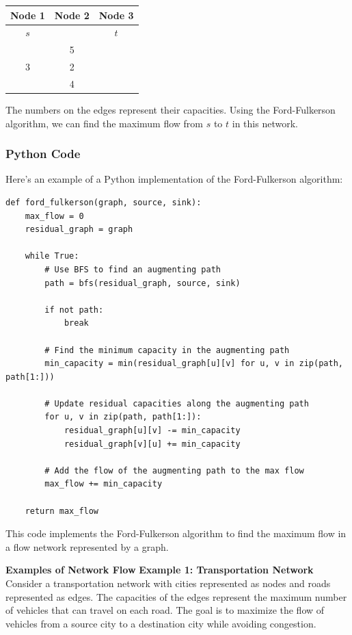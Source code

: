 \documentclass[12pt]{book} %
\begin{document}
\begin{center}
\begin{tabular}{ c c c }
    \textbf{Node 1} & \textbf{Node 2} & \textbf{Node 3} \\
    \hline
    $s$ & & $t$ \\
    & 5 & \\
    3 & 2 & \\
    & 4 & \\
\end{tabular}
\end{center}

The numbers on the edges represent their capacities. Using the Ford-Fulkerson algorithm, we can find the maximum flow from \( s \) to \( t \) in this network.

\subsubsection{Python Code}
Here's an example of a Python implementation of the Ford-Fulkerson algorithm:

\begin{lstlisting}
def ford_fulkerson(graph, source, sink):
    max_flow = 0
    residual_graph = graph
    
    while True:
        # Use BFS to find an augmenting path
        path = bfs(residual_graph, source, sink)
        
        if not path:
            break
        
        # Find the minimum capacity in the augmenting path
        min_capacity = min(residual_graph[u][v] for u, v in zip(path, path[1:]))
        
        # Update residual capacities along the augmenting path
        for u, v in zip(path, path[1:]):
            residual_graph[u][v] -= min_capacity
            residual_graph[v][u] += min_capacity
        
        # Add the flow of the augmenting path to the max flow
        max_flow += min_capacity
    
    return max_flow
\end{lstlisting}
\FloatBarrier
This code implements the Ford-Fulkerson algorithm to find the maximum flow in a flow network represented by a graph.

\textbf{Examples of Network Flow}
\textbf{Example 1: Transportation Network}
Consider a transportation network with cities represented as nodes and roads represented as edges. The capacities of the edges represent the maximum number of vehicles that can travel on each road. The goal is to maximize the flow of vehicles from a source city to a destination city while avoiding congestion.
\end{document}
